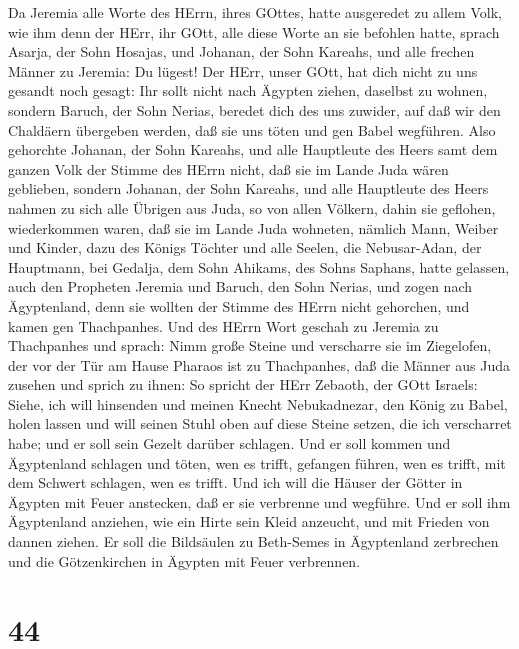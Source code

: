  Da Jeremia alle Worte des HErrn, ihres GOttes, hatte
ausgeredet zu allem Volk, wie ihm denn der HErr, ihr GOtt, alle diese
Worte an sie befohlen hatte,  sprach Asarja, der Sohn
Hosajas, und Johanan, der Sohn Kareahs, und alle frechen Männer zu
Jeremia: Du lügest! Der HErr, unser GOtt, hat dich nicht zu uns gesandt
noch gesagt: Ihr sollt nicht nach Ägypten ziehen, daselbst zu wohnen,
 sondern Baruch, der Sohn Nerias, beredet dich des uns
zuwider, auf daß wir den Chaldäern übergeben werden, daß sie uns töten
und gen Babel wegführen.  Also gehorchte Johanan, der Sohn
Kareahs, und alle Hauptleute des Heers samt dem ganzen Volk der Stimme
des HErrn nicht, daß sie im Lande Juda wären geblieben, 
sondern Johanan, der Sohn Kareahs, und alle Hauptleute des Heers nahmen
zu sich alle Übrigen aus Juda, so von allen Völkern, dahin sie geflohen,
wiederkommen waren, daß sie im Lande Juda wohneten,  nämlich
Mann, Weiber und Kinder, dazu des Königs Töchter und alle Seelen, die
Nebusar-Adan, der Hauptmann, bei Gedalja, dem Sohn Ahikams, des Sohns
Saphans, hatte gelassen, auch den Propheten Jeremia und Baruch, den Sohn
Nerias,  und zogen nach Ägyptenland, denn sie wollten der
Stimme des HErrn nicht gehorchen, und kamen gen Thachpanhes.
 Und des HErrn Wort geschah zu Jeremia zu Thachpanhes und
sprach:  Nimm große Steine und verscharre sie im Ziegelofen,
der vor der Tür am Hause Pharaos ist zu Thachpanhes, daß die Männer aus
Juda zusehen  und sprich zu ihnen: So spricht der HErr
Zebaoth, der GOtt Israels: Siehe, ich will hinsenden und meinen Knecht
Nebukadnezar, den König zu Babel, holen lassen und will seinen Stuhl
oben auf diese Steine setzen, die ich verscharret habe; und er soll sein
Gezelt darüber schlagen.  Und er soll kommen und
Ägyptenland schlagen und töten, wen es trifft, gefangen führen, wen es
trifft, mit dem Schwert schlagen, wen es trifft.  Und ich
will die Häuser der Götter in Ägypten mit Feuer anstecken, daß er sie
verbrenne und wegführe. Und er soll ihm Ägyptenland anziehen, wie ein
Hirte sein Kleid anzeucht, und mit Frieden von dannen ziehen.
 Er soll die Bildsäulen zu Beth-Semes in Ägyptenland
zerbrechen und die Götzenkirchen in Ägypten mit Feuer verbrennen.

\hypertarget{section-43}{%
\section{44}\label{section-43}}


